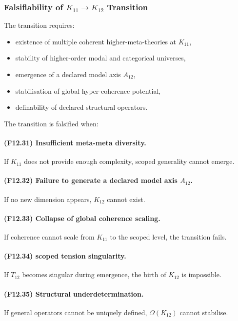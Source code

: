 \subsubsection{Falsifiability of $K_{11} \to K_{12}$ Transition}

The transition requires:

\begin{itemize}
    \item existence of multiple coherent higher-meta-theories at $K_{11}$,
    \item stability of higher-order modal and categorical universes,
    \item emergence of a declared model axis $A_{12}$,
    \item stabilisation of global hyper-coherence potential,
    \item definability of declared structural operators.
\end{itemize}

The transition is falsified when:

\paragraph{(F12.31) Insufficient meta-meta diversity.}
If $K_{11}$ does not provide enough complexity, scoped generality cannot emerge.

\paragraph{(F12.32) Failure to generate a declared model axis $A_{12}$.}
If no new dimension appears, $K_{12}$ cannot exist.

\paragraph{(F12.33) Collapse of global coherence scaling.}
If coherence cannot scale from $K_{11}$ to the scoped level,
the transition fails.

\paragraph{(F12.34) scoped tension singularity.}
If $T_{12}$ becomes singular during emergence,
the birth of $K_{12}$ is impossible.

\paragraph{(F12.35) Structural underdetermination.}
If general operators cannot be uniquely defined,
$\Omega(K_{12})$ cannot stabilise.



